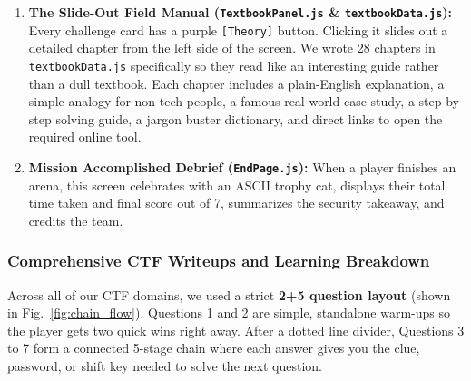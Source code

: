 \documentclass[11pt,a4paper]{article}
\begin{document}
\begin{enumerate}
    \item \textbf{The Slide-Out Field Manual (\texttt{TextbookPanel.js} \& \texttt{textbookData.js}):} Every challenge card has a purple \texttt{[Theory]} button. Clicking it slides out a detailed chapter from the left side of the screen. We wrote 28 chapters in \texttt{textbookData.js} specifically so they read like an interesting guide rather than a dull textbook. Each chapter includes a plain-English explanation, a simple analogy for non-tech people, a famous real-world case study, a step-by-step solving guide, a jargon buster dictionary, and direct links to open the required online tool.
    \item \textbf{Mission Accomplished Debrief (\texttt{EndPage.js}):} When a player finishes an arena, this screen celebrates with an ASCII trophy cat, displays their total time taken and final score out of 7, summarizes the security takeaway, and credits the team.
\end{enumerate}

\clearpage
\subsubsection{Comprehensive CTF Writeups and Learning Breakdown}
Across all of our CTF domains, we used a strict \textbf{2+5 question layout} (shown in Fig.~\ref{fig:chain_flow}). Questions 1 and 2 are simple, standalone warm-ups so the player gets two quick wins right away. After a dotted line divider, Questions 3 to 7 form a connected 5-stage chain where each answer gives you the clue, password, or shift key needed to solve the next question.
\end{document}
